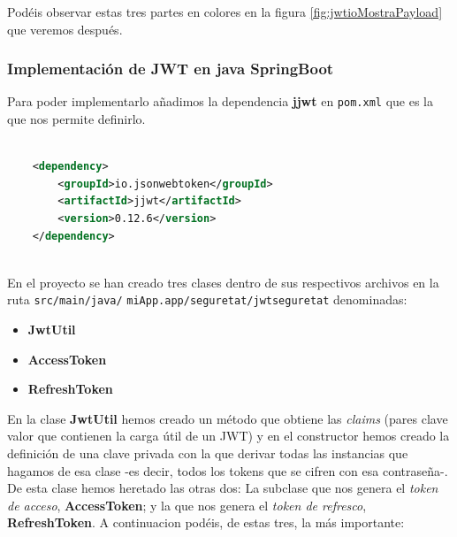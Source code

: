 \documentclass[a4paper,12pt]{report}
\begin{document}
				Podéis observar estas tres partes en colores en la figura \ref{fig:jwtioMostraPayload} que veremos después.
				
				
				

				

				
				
				\subsubsection{Implementación de JWT en java SpringBoot}
				\label{sec:implementacionJWTjava}
				Para poder implementarlo añadimos la dependencia \textbf{jjwt} en \texttt{pom.xml} que es la que nos permite definirlo.
				
				
				\begin{lstlisting}[language=XML, basicstyle=\ttfamily\small, keywordstyle=\color{red}]
					
	<dependency>
		<groupId>io.jsonwebtoken</groupId>
		<artifactId>jjwt</artifactId>
		<version>0.12.6</version>
	</dependency>
					
				\end{lstlisting}
				
				
		En el proyecto se han creado tres clases dentro de sus respectivos archivos en la ruta \texttt{src/main/java/} \texttt{miApp.app/seguretat/jwtseguretat} denominadas:
		
		\begin{itemize}
			\setlength{\itemsep}{-.4em}
			\item \textbf{JwtUtil}
			\item \textbf{AccessToken}
			\item \textbf{RefreshToken}
		\end{itemize}
		  
		
		En la clase \textbf{JwtUtil} hemos creado un método que obtiene las \textit{claims} (pares clave valor que contienen la carga útil de un JWT) y en el constructor hemos creado la definición de una clave privada con la que derivar todas las instancias que hagamos de esa clase -es decir, todos los tokens que se cifren con esa contraseña-. De esta clase hemos heretado las otras dos: La subclase que nos genera el \textit{token de acceso}, \textbf{AccessToken}; y la que nos genera el \textit{token de refresco}, \textbf{RefreshToken}. A continuacion podéis, de estas tres, la más importante: 
		
		
\end{document}
